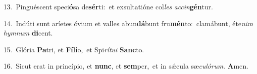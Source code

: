 {\numbfont\textcolor{\numbcolor}{13.}}~Pinguéscent speci\-\textbf{ó}\-sa de\-\textbf{sér}\-ti:~\star et exsultatióne col\textit{les} \textit{ac}\-\textit{cin}\textbf{gén}tur.\par
{\numbfont\textcolor{\numbcolor}{14.}}~Indúti sunt aríetes óvium et valles abun\-\textbf{dá}\-bunt fru\-\textbf{mén}\-to:~\star clamábunt, éte\textit{nim} \textit{hym}\-\textit{num} \textbf{di}\-cent.\par
{\numbfont\textcolor{\numbcolor}{15.}}~Glória \textbf{Pa}\-tri, et \textbf{Fí}\-\textbf{li}o,~\star et Spi\-\textit{rí}\-\textit{tu}\textit{i} \textbf{Sanc}\-to.\par
{\numbfont\textcolor{\numbcolor}{16.}}~Sicut erat in princípio, et \textbf{nunc}\-, et \textbf{sem}\-per,~\star et in sǽcula sæ\-\textit{cu}\-\textit{ló}\textit{rum}. \textbf{A}\-men.\par

